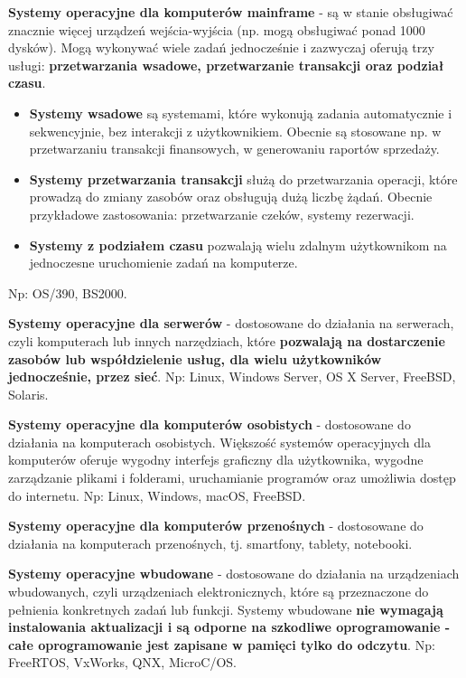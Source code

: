 \documentclass{article}
\begin{document}
\newpage\textbf{Systemy operacyjne dla komputerów mainframe} - są w stanie obsługiwać znacznie więcej urządzeń wejścia-wyjścia (np. mogą obsługiwać ponad 1000 dysków). Mogą wykonywać wiele zadań jednocześnie i zazwyczaj oferują trzy usługi: \textbf{przetwarzania wsadowe, przetwarzanie transakcji oraz podział czasu}.

\begin{itemize}
\item \textbf{Systemy wsadowe} są systemami, które wykonują zadania automatycznie i sekwencyjnie, bez interakcji z użytkownikiem. Obecnie są stosowane np. w przetwarzaniu transakcji finansowych, w generowaniu raportów sprzedaży.
\item \textbf{Systemy przetwarzania transakcji} służą do przetwarzania operacji, które prowadzą do zmiany zasobów oraz obsługują dużą liczbę żądań. Obecnie przykładowe zastosowania: przetwarzanie czeków, systemy rezerwacji.
\item \textbf{Systemy z podziałem czasu} pozwalają wielu zdalnym użytkownikom na jednoczesne uruchomienie zadań na komputerze.
\end{itemize}
Np: OS/390, BS2000.

\textbf{Systemy operacyjne dla serwerów} - dostosowane do działania na serwerach, czyli komputerach lub innych narzędziach, które \textbf{pozwalają na dostarczenie zasobów lub współdzielenie usług, dla wielu użytkowników jednocześnie, przez sieć}. Np: Linux, Windows Server, OS X Server, FreeBSD, Solaris.

\textbf{Systemy operacyjne dla komputerów osobistych} - dostosowane do działania na komputerach osobistych. Większość systemów operacyjnych dla komputerów oferuje wygodny interfejs graficzny dla użytkownika, wygodne zarządzanie plikami i folderami, uruchamianie programów oraz umożliwia dostęp do internetu. Np: Linux, Windows, macOS, FreeBSD.

\textbf{Systemy operacyjne dla komputerów przenośnych} - dostosowane do działania na komputerach przenośnych, tj. smartfony, tablety, notebooki.

\textbf{Systemy operacyjne wbudowane} - dostosowane do działania na urządzeniach wbudowanych, czyli urządzeniach elektronicznych, które są przeznaczone do pełnienia konkretnych zadań lub funkcji. Systemy wbudowane \textbf{nie wymagają instalowania aktualizacji i są odporne na szkodliwe oprogramowanie - całe oprogramowanie jest zapisane w pamięci tylko do odczytu}. Np: FreeRTOS, VxWorks, QNX, MicroC/OS.
\end{document}
